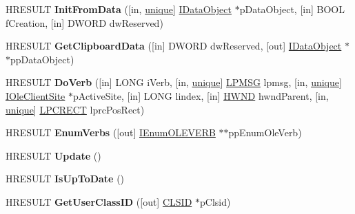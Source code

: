 \begin{DoxyCompactItemize}
H\+R\+E\+S\+U\+LT {\bfseries Init\+From\+Data} (\mbox{[}in, \hyperlink{interfaceunique}{unique}\mbox{]} \hyperlink{interface_i_data_object}{I\+Data\+Object} $\ast$p\+Data\+Object, \mbox{[}in\mbox{]} B\+O\+OL f\+Creation, \mbox{[}in\mbox{]} D\+W\+O\+RD dw\+Reserved)
\item 
\mbox{\label{interface_i_ole_object_a65cff49131fb0b9cf25808772fd526ef}} 
H\+R\+E\+S\+U\+LT {\bfseries Get\+Clipboard\+Data} (\mbox{[}in\mbox{]} D\+W\+O\+RD dw\+Reserved, \mbox{[}out\mbox{]} \hyperlink{interface_i_data_object}{I\+Data\+Object} $\ast$$\ast$pp\+Data\+Object)
\item 
\mbox{\label{interface_i_ole_object_aeb778cde23a25a035bcf43264dfa13d2}} 
H\+R\+E\+S\+U\+LT {\bfseries Do\+Verb} (\mbox{[}in\mbox{]} L\+O\+NG i\+Verb, \mbox{[}in, \hyperlink{interfaceunique}{unique}\mbox{]} \hyperlink{structtag_m_s_g}{L\+P\+M\+SG} lpmsg, \mbox{[}in, \hyperlink{interfaceunique}{unique}\mbox{]} \hyperlink{interface_i_ole_client_site}{I\+Ole\+Client\+Site} $\ast$p\+Active\+Site, \mbox{[}in\mbox{]} L\+O\+NG lindex, \mbox{[}in\mbox{]} \hyperlink{interfacevoid}{H\+W\+ND} hwnd\+Parent, \mbox{[}in, \hyperlink{interfaceunique}{unique}\mbox{]} \hyperlink{structtag_r_e_c_t}{L\+P\+C\+R\+E\+CT} lprc\+Pos\+Rect)
\item 
\mbox{\label{interface_i_ole_object_a95d4a25e2371f7e188ed3391e8a3ce86}} 
H\+R\+E\+S\+U\+LT {\bfseries Enum\+Verbs} (\mbox{[}out\mbox{]} \hyperlink{interface_i_enum_o_l_e_v_e_r_b}{I\+Enum\+O\+L\+E\+V\+E\+RB} $\ast$$\ast$pp\+Enum\+Ole\+Verb)
\item 
\mbox{\label{interface_i_ole_object_aced6d34a3efd76a472e5cd87e268c9af}} 
H\+R\+E\+S\+U\+LT {\bfseries Update} ()
\item 
\mbox{\label{interface_i_ole_object_a5801ad3b2869a4e3fa131784bd45567e}} 
H\+R\+E\+S\+U\+LT {\bfseries Is\+Up\+To\+Date} ()
\item 
\mbox{\label{interface_i_ole_object_a625b9e2bd320a34c7266e4f902dafde3}} 
H\+R\+E\+S\+U\+LT {\bfseries Get\+User\+Class\+ID} (\mbox{[}out\mbox{]} \hyperlink{struct___i_i_d}{C\+L\+S\+ID} $\ast$p\+Clsid)
\item 
\mbox{\label{interface_i_ole_object_a3453169718285fdf6686dab3b0ec190b}} 

\end{DoxyCompactItemize}
